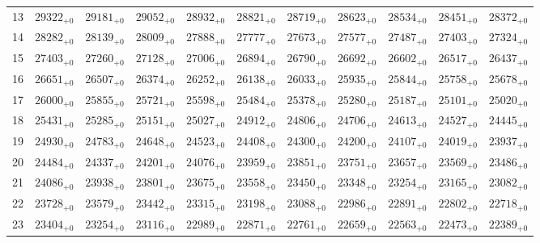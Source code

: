 \documentclass[10pt, a4paper]{article}
\begin{document}
\begin{center}
\begin{tabular}{c || c c c c c | c c c c c}
        13 & \({29322}_{+0}\) & \({29181}_{+0}\) & \({29052}_{+0}\) & \({28932}_{+0}\) & \({28821}_{+0}\) & \({28719}_{+0}\) & \({28623}_{+0}\) & \({28534}_{+0}\) & \({28451}_{+0}\) & \({28372}_{+0}\)\\
        14 & \({28282}_{+0}\) & \({28139}_{+0}\) & \({28009}_{+0}\) & \({27888}_{+0}\) & \({27777}_{+0}\) & \({27673}_{+0}\) & \({27577}_{+0}\) & \({27487}_{+0}\) & \({27403}_{+0}\) & \({27324}_{+0}\)\\
        15 & \({27403}_{+0}\) & \({27260}_{+0}\) & \({27128}_{+0}\) & \({27006}_{+0}\) & \({26894}_{+0}\) & \({26790}_{+0}\) & \({26692}_{+0}\) & \({26602}_{+0}\) & \({26517}_{+0}\) & \({26437}_{+0}\)\\
        \hline
        16 & \({26651}_{+0}\) & \({26507}_{+0}\) & \({26374}_{+0}\) & \({26252}_{+0}\) & \({26138}_{+0}\) & \({26033}_{+0}\) & \({25935}_{+0}\) & \({25844}_{+0}\) & \({25758}_{+0}\) & \({25678}_{+0}\)\\
        17 & \({26000}_{+0}\) & \({25855}_{+0}\) & \({25721}_{+0}\) & \({25598}_{+0}\) & \({25484}_{+0}\) & \({25378}_{+0}\) & \({25280}_{+0}\) & \({25187}_{+0}\) & \({25101}_{+0}\) & \({25020}_{+0}\)\\
        18 & \({25431}_{+0}\) & \({25285}_{+0}\) & \({25151}_{+0}\) & \({25027}_{+0}\) & \({24912}_{+0}\) & \({24806}_{+0}\) & \({24706}_{+0}\) & \({24613}_{+0}\) & \({24527}_{+0}\) & \({24445}_{+0}\)\\
        19 & \({24930}_{+0}\) & \({24783}_{+0}\) & \({24648}_{+0}\) & \({24523}_{+0}\) & \({24408}_{+0}\) & \({24300}_{+0}\) & \({24200}_{+0}\) & \({24107}_{+0}\) & \({24019}_{+0}\) & \({23937}_{+0}\)\\
        20 & \({24484}_{+0}\) & \({24337}_{+0}\) & \({24201}_{+0}\) & \({24076}_{+0}\) & \({23959}_{+0}\) & \({23851}_{+0}\) & \({23751}_{+0}\) & \({23657}_{+0}\) & \({23569}_{+0}\) & \({23486}_{+0}\)\\
        \hline
        21 & \({24086}_{+0}\) & \({23938}_{+0}\) & \({23801}_{+0}\) & \({23675}_{+0}\) & \({23558}_{+0}\) & \({23450}_{+0}\) & \({23348}_{+0}\) & \({23254}_{+0}\) & \({23165}_{+0}\) & \({23082}_{+0}\)\\
        22 & \({23728}_{+0}\) & \({23579}_{+0}\) & \({23442}_{+0}\) & \({23315}_{+0}\) & \({23198}_{+0}\) & \({23088}_{+0}\) & \({22986}_{+0}\) & \({22891}_{+0}\) & \({22802}_{+0}\) & \({22718}_{+0}\)\\
        23 & \({23404}_{+0}\) & \({23254}_{+0}\) & \({23116}_{+0}\) & \({22989}_{+0}\) & \({22871}_{+0}\) & \({22761}_{+0}\) & \({22659}_{+0}\) & \({22563}_{+0}\) & \({22473}_{+0}\) & \({22389}_{+0}\)\\

\end{tabular}
\end{center}
\end{document}
